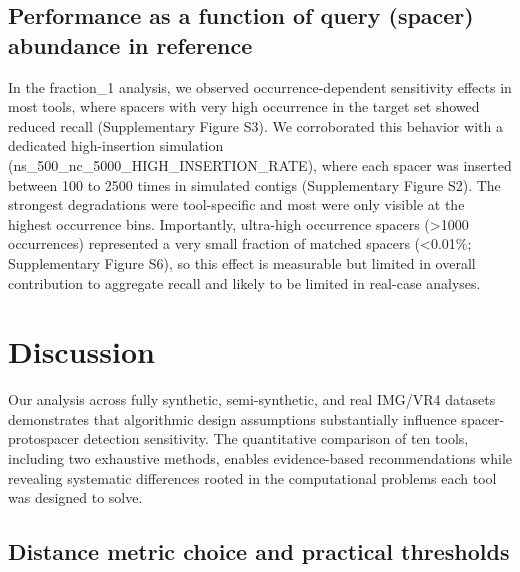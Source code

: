 \documentclass[
]{article}
\begin{document}
\subsection{Performance as a function of query (spacer) abundance in
reference}\label{sec-performance-as-a-function-of-query-spacer-abundance-in-reference}

In the fraction\_1 analysis, we observed occurrence-dependent
sensitivity effects in most tools, where spacers with very high
occurrence in the target set showed reduced recall (Supplementary Figure
S3). We corroborated this behavior with a dedicated high-insertion
simulation (ns\_500\_nc\_5000\_HIGH\_INSERTION\_RATE), where each spacer
was inserted between 100 to 2500 times in simulated contigs
(Supplementary Figure S2). The strongest degradations were tool-specific
and most were only visible at the highest occurrence bins. Importantly,
ultra-high occurrence spacers (\textgreater1000 occurrences) represented
a very small fraction of matched spacers (\textless0.01\%; Supplementary
Figure S6), so this effect is measurable but limited in overall
contribution to aggregate recall and likely to be limited in real-case
analyses.

\section{Discussion}\label{sec-discussion}

Our analysis across fully synthetic, semi-synthetic, and real IMG/VR4
datasets demonstrates that algorithmic design assumptions substantially
influence spacer-protospacer detection sensitivity. The quantitative
comparison of ten tools, including two exhaustive methods, enables
evidence-based recommendations while revealing systematic differences
rooted in the computational problems each tool was designed to solve.

\subsection{Distance metric choice and practical
thresholds}\label{sec-distance-thresholds}
\end{document}
